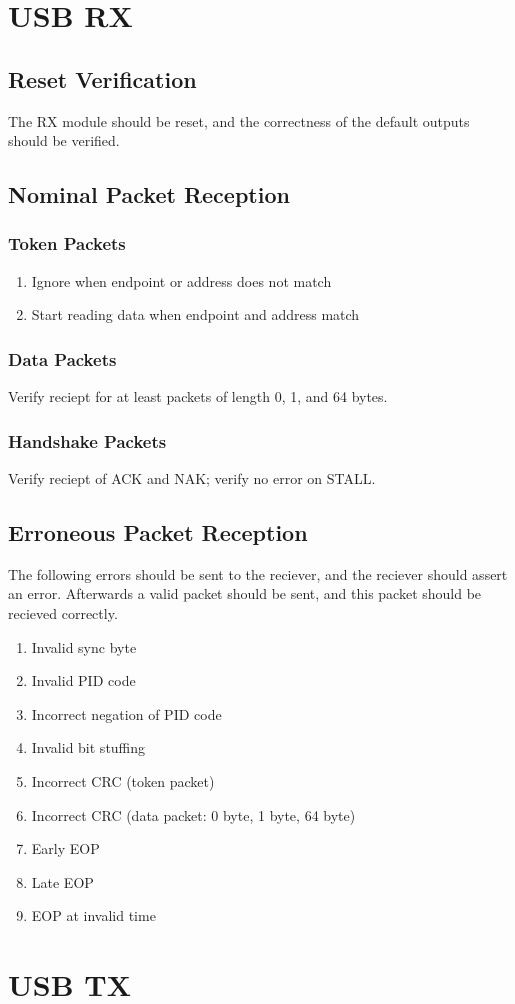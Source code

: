 \documentclass{scrartcl}
\begin{document}
\section{USB RX}
\subsection{Reset Verification}
The RX module should be reset, and the correctness of the default outputs should be verified.

\subsection{Nominal Packet Reception}
\subsubsection{Token Packets}
\begin{enumerate}
    \item Ignore when endpoint or address does not match
    \item Start reading data when endpoint and address match
\end{enumerate}

\subsubsection{Data Packets}
Verify reciept for at least packets of length 0, 1, and 64 bytes.

\subsubsection{Handshake Packets}
Verify reciept of ACK and NAK; verify no error on STALL.

\subsection{Erroneous Packet Reception}
The following errors should be sent to the reciever, and the reciever should assert an error. Afterwards a valid
packet should be sent, and this packet should be recieved correctly.
\begin{enumerate}
    \item Invalid sync byte
    \item Invalid PID code
    \item Incorrect negation of PID code
    \item Invalid bit stuffing
    \item Incorrect CRC (token packet)
    \item Incorrect CRC (data packet: 0 byte, 1 byte, 64 byte)
    \item Early EOP
    \item Late EOP
    \item EOP at invalid time
\end{enumerate}

\section{USB TX}
\end{document}
